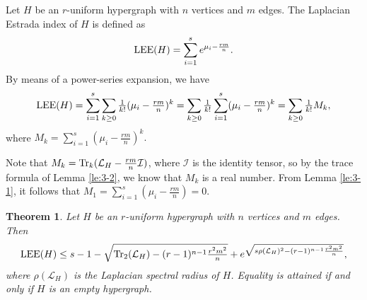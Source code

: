 \documentclass[11pt]{article}
\newtheorem{theorem}{Theorem}[section]
\def\LEE{\mathop{\rm LEE }\nolimits}
\def\Tr{\mathop{\rm Tr }\nolimits}
\begin{document}
Let $H$ be an $r$-uniform hypergraph with $n$ vertices and $m$ edges. The Laplacian Estrada index of $H$ is defined as  $$\LEE(H)=\sum_{i=1}^{s}e^{\mu_{i}-\frac{rm}{n}}.$$
By means of a power-series expansion, we have $$\LEE(H)=\sum_{i=1}^{s}\sum_{k\geq 0}\tfrac{1}{k!}(\mu_{i}-\tfrac{rm}{n})^{k}=\sum_{k\geq 0}\tfrac{1}{k!}\sum_{i=1}^{s}(\mu_{i}-\tfrac{rm}{n})^{k}=\sum_{k\geq 0}\tfrac{1}{k!}M_{k},$$
where $M_{k}=\sum\limits_{i=1}^{s}(\mu_{i}-\tfrac{rm}{n})^{k}.$

Note that $M_k=\Tr_k(\mathcal{L}_H-\tfrac{rm}{n}\mathcal{I})$, where $\mathcal{I}$ is the identity tensor, so by the trace formula of Lemma \ref{le:3-2}, we know that $M_k$ is a real number. From Lemma \ref{le:3-1}, it follows that $M_1=\sum\limits_{i=1}^{s}(\mu_{i}-\tfrac{rm}{n})=0$.

\noindent\begin{theorem}\label{th:5-1}
Let $H$ be an $r$-uniform hypergraph with $n$ vertices and $m$ edges. Then
$$\LEE(H) \leq s-1-\sqrt{\Tr_{2}(\mathcal{L}_{H})-(r-1)^{n-1}\tfrac{r^{2}m^{2}}{n}}+e^{\sqrt{s\rho(\mathcal{L}_{H})^{2}-(r-1)^{n-1}\frac{r^{2}m^{2}}{n}}},$$
where $\rho(\mathcal{L}_{H})$ is the Laplacian spectral radius of $H$. Equality is attained if and only if $H$ is an empty hypergraph.
\end{theorem}
\end{document}
